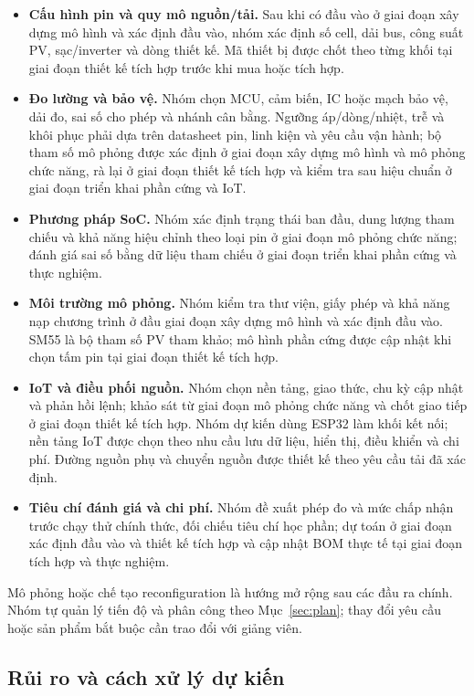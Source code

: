 \begin{itemize}
    \item \textbf{Cấu hình pin và quy mô nguồn/tải.} Sau khi có đầu vào ở giai đoạn xây dựng mô hình và xác định đầu vào, nhóm xác định số cell, dải bus, công suất PV, sạc/inverter và dòng thiết kế. Mã thiết bị được chốt theo từng khối tại giai đoạn thiết kế tích hợp trước khi mua hoặc tích hợp.
    \item \textbf{Đo lường và bảo vệ.} Nhóm chọn MCU, cảm biến, IC hoặc mạch bảo vệ, dải đo, sai số cho phép và nhánh cân bằng. Ngưỡng áp/dòng/nhiệt, trễ và khôi phục phải dựa trên datasheet pin, linh kiện và yêu cầu vận hành; bộ tham số mô phỏng được xác định ở giai đoạn xây dựng mô hình và mô phỏng chức năng, rà lại ở giai đoạn thiết kế tích hợp và kiểm tra sau hiệu chuẩn ở giai đoạn triển khai phần cứng và IoT.
    \item \textbf{Phương pháp SoC.} Nhóm xác định trạng thái ban đầu, dung lượng tham chiếu và khả năng hiệu chỉnh theo loại pin ở giai đoạn mô phỏng chức năng; đánh giá sai số bằng dữ liệu tham chiếu ở giai đoạn triển khai phần cứng và thực nghiệm.
    \item \textbf{Môi trường mô phỏng.} Nhóm kiểm tra thư viện, giấy phép và khả năng nạp chương trình ở đầu giai đoạn xây dựng mô hình và xác định đầu vào. SM55 là bộ tham số PV tham khảo; mô hình phần cứng được cập nhật khi chọn tấm pin tại giai đoạn thiết kế tích hợp.
    \item \textbf{IoT và điều phối nguồn.} Nhóm chọn nền tảng, giao thức, chu kỳ cập nhật và phản hồi lệnh; khảo sát từ giai đoạn mô phỏng chức năng và chốt giao tiếp ở giai đoạn thiết kế tích hợp. Nhóm dự kiến dùng ESP32 làm khối kết nối; nền tảng IoT được chọn theo nhu cầu lưu dữ liệu, hiển thị, điều khiển và chi phí. Đường nguồn phụ và chuyển nguồn được thiết kế theo yêu cầu tải đã xác định.
    \item \textbf{Tiêu chí đánh giá và chi phí.} Nhóm đề xuất phép đo và mức chấp nhận trước chạy thử chính thức, đối chiếu tiêu chí học phần; dự toán ở giai đoạn xác định đầu vào và thiết kế tích hợp và cập nhật BOM thực tế tại giai đoạn tích hợp và thực nghiệm.
\end{itemize}

Mô phỏng hoặc chế tạo reconfiguration là hướng mở rộng sau các đầu ra chính. Nhóm tự quản lý tiến độ và phân công theo Mục~\ref{sec:plan}; thay đổi yêu cầu hoặc sản phẩm bắt buộc cần trao đổi với giảng viên.

\subsection{Rủi ro và cách xử lý dự kiến}

